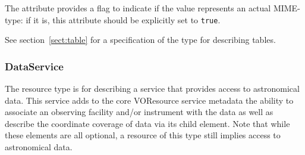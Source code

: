 \documentclass[11pt,a4paper]{ivoa}
\begin{document}


The  attribute
provides a flag to indicate if the value represents an actual
MIME-type: if it is, this attribute should be explicitly set to
\texttt{true}.




See section~\ref{sect:table} for a specification of
the  type for describing tables.  



\subsubsection{DataService}


The  resource type is for describing a
service that provides access to astronomical data.  This service adds
to the core VOResource service metadata the ability to associate an
observing facility and/or instrument with the data as well as describe
the coordinate coverage of data via its child 
element.  Note that while these elements are all optional, a resource
of this type still implies access to astronomical data.
\end{document}
